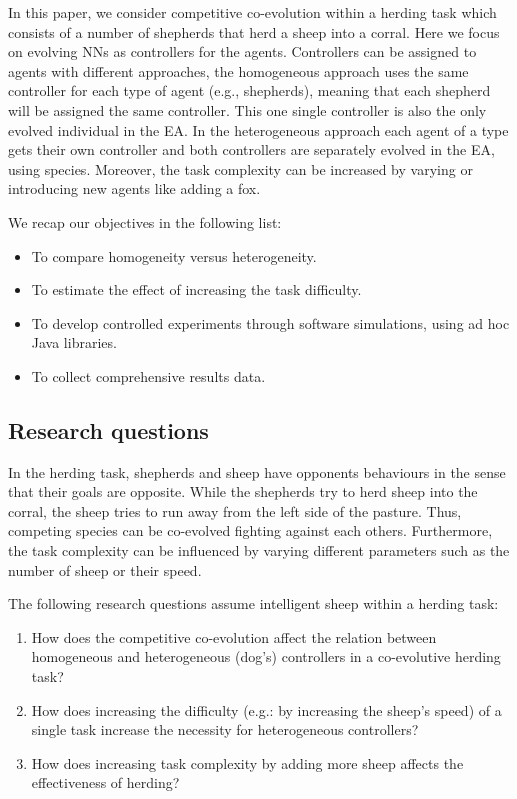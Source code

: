 \documentclass[conference]{IEEEtran}
\begin{document}
In this paper, we consider competitive co-evolution within a herding task which consists of a number of shepherds that herd a sheep into a corral.
Here we focus on evolving NNs as controllers for the agents.
Controllers can be assigned to agents with different approaches, the homogeneous approach uses the same controller for each type of agent (e.g., shepherds), meaning that each shepherd will be assigned the same controller. This one single controller is also the only evolved individual in the EA. In the heterogeneous approach each agent of a type gets their own controller and both controllers are separately evolved in the EA, using species.
Moreover, the task complexity can be increased by varying or introducing new agents like adding a fox.

We recap our objectives in the following list:

\begin{itemize}
	\item To compare homogeneity versus heterogeneity.
	\item To estimate the effect of increasing the task difficulty.
 	\item To develop controlled experiments through software simulations, using ad hoc Java libraries.
	\item To collect comprehensive results data.
\end{itemize}
 
\subsection{Research questions}
In the herding task, shepherds and sheep have opponents behaviours in the sense that their goals are opposite.
While the shepherds try to herd sheep into the corral, the sheep tries to run away from the left side of the pasture.
Thus, competing species can be co-evolved fighting against each others.
Furthermore, the task complexity can be influenced by varying different parameters such as the number of sheep or their speed.

The following research questions assume intelligent sheep within a herding task:
 
\begin{enumerate}
	\item How does the competitive co-evolution affect the relation between homogeneous and heterogeneous (dog’s) controllers in a co-evolutive herding task?
	\item How does increasing the difficulty (e.g.: by increasing the sheep’s speed) of a single task increase the necessity for heterogeneous controllers?
	\item How does increasing task complexity by adding more sheep affects the effectiveness of herding?
\end{enumerate}
\end{document}
